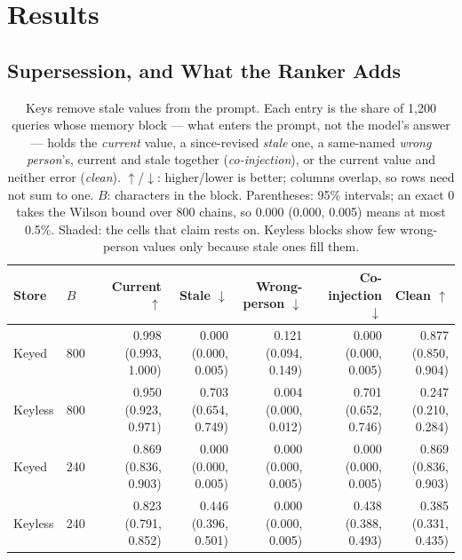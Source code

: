 \documentclass{article} %
\begin{document}
\section{Results}

\subsection{Supersession, and What the Ranker Adds}
\label{sec:temporal}

\begin{table}[t]
\centering
\small
\setlength{\tabcolsep}{3pt}
\begin{tabular}{@{}llrrrrr@{}}
\toprule
Store & $B$ & Current $\uparrow$ & Stale $\downarrow$ & Wrong-person $\downarrow$ & Co-injection $\downarrow$ & Clean $\uparrow$ \\
\midrule
Keyed & 800 & 0.998 {\scriptsize(0.993, 1.000)} & \cellcolor{cPos!60}0.000 {\scriptsize(0.000, 0.005)} & 0.121 {\scriptsize(0.094, 0.149)} & 0.000 {\scriptsize(0.000, 0.005)} & \cellcolor{cPos!60}0.877 {\scriptsize(0.850, 0.904)} \\
Keyless & 800 & 0.950 {\scriptsize(0.923, 0.971)} & 0.703 {\scriptsize(0.654, 0.749)} & 0.004 {\scriptsize(0.000, 0.012)} & 0.701 {\scriptsize(0.652, 0.746)} & 0.247 {\scriptsize(0.210, 0.284)} \\
\midrule
Keyed & 240 & 0.869 {\scriptsize(0.836, 0.903)} & 0.000 {\scriptsize(0.000, 0.005)} & 0.000 {\scriptsize(0.000, 0.005)} & 0.000 {\scriptsize(0.000, 0.005)} & 0.869 {\scriptsize(0.836, 0.903)} \\
Keyless & 240 & 0.823 {\scriptsize(0.791, 0.852)} & 0.446 {\scriptsize(0.396, 0.501)} & 0.000 {\scriptsize(0.000, 0.005)} & 0.438 {\scriptsize(0.388, 0.493)} & 0.385 {\scriptsize(0.331, 0.435)} \\
\bottomrule
\end{tabular}
\caption{Keys remove stale values from the prompt. Each entry is the share of 1{,}200 queries whose memory block --- what enters the prompt, not the model's answer --- holds the \emph{current} value, a since-revised \emph{stale} one, a same-named \emph{wrong person}'s, current and stale together (\emph{co-injection}), or the current value and neither error (\emph{clean}). $\uparrow$/$\downarrow$: higher/lower is better; columns overlap, so rows need not sum to one. $B$: characters in the block. Parentheses: 95\% intervals; an exact 0 takes the Wilson bound over 800 chains, so 0.000 (0.000, 0.005) means at most 0.5\%. Shaded: the cells that claim rests on. Keyless blocks show few wrong-person values only because stale ones fill them.}
\label{tab:temporal}
\end{table}
\end{document}
